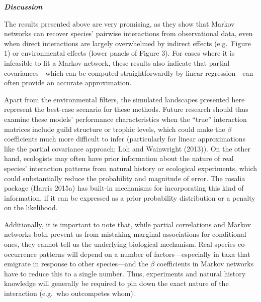 \documentclass[12pt,]{article}
\begin{document}
\begin{spacing}{1.9}
\begin{flushleft}
\textbf{\emph{Discussion}}

The results presented above are very promising, as they show that Markov
networks can recover species' pairwise interactions from observational
data, even when direct interactions are largely overwhelmed by indirect
effects (e.g.~Figure 1) or environmental effects (lower panels of Figure
3). For cases where it is infeasible to fit a Markov network, these
results also indicate that partial covariances---which can be computed
straightforwardly by linear regression---can often provide an accurate
approximation.

Apart from the environmental filters, the simulated landscapes presented
here represent the best-case scenario for these methods. Future research
should thus examine these models' performance characteristics when the
``true'' interaction matrices include guild structure or trophic levels,
which could make the \(\beta\) coefficients much more difficult to infer
(particularly for linear approximations like the partial covariance
approach; Loh and Wainwright (2013)). On the other hand, ecologists may
often have prior information about the nature of real species'
interaction patterns from natural history or ecological experiments,
which could substantially reduce the probability and magnitude of error.
The rosalia package (Harris 2015a) has built-in mechanisms for
incorporating this kind of information, if it can be expressed as a
prior probability distribution or a penalty on the likelihood.

Additionally, it is important to note that, while partial correlations
and Markov networks both prevent us from mistaking marginal associations
for conditional ones, they cannot tell us the underlying biological
mechanism. Real species co-occurrence patterns will depend on a number
of factors---especially in taxa that emigrate in response to other
species---and the \(\beta\) coefficients in Markov networks have to
reduce this to a single number. Thus, experiments and natural history
knowledge will generally be required to pin down the exact nature of the
interaction (e.g.~who outcompetes whom).


\end{flushleft}
\end{spacing}
\end{document}

